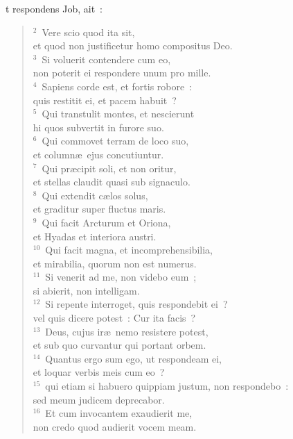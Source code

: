 \bchapter
{}t respondens Job, ait~:
\begin{flushleft}\begin{verse}\vspace{6pt}${}^{2}$~Vere scio quod ita sit,\\ et quod non justificetur homo compositus Deo.\\
${}^{3}$~Si voluerit contendere cum eo,\\ non poterit ei respondere unum pro mille.\\
${}^{4}$~Sapiens corde est, et fortis robore~:\\ quis restitit ei, et pacem habuit~?\\
${}^{5}$~Qui transtulit montes, et nescierunt\\ hi quos subvertit in furore suo.\\
${}^{6}$~Qui commovet terram de loco suo,\\ et column\ae\ ejus concutiuntur.\\
${}^{7}$~Qui pr\ae cipit soli, et non oritur,\\ et stellas claudit quasi sub signaculo.\\
${}^{8}$~Qui extendit c\ae los solus,\\ et graditur super fluctus maris.\\
${}^{9}$~Qui facit Arcturum et Oriona,\\ et Hyadas et interiora austri.\\
${}^{10}$~Qui facit magna, et incomprehensibilia,\\ et mirabilia, quorum non est numerus.\\
${}^{11}$~Si venerit ad me, non videbo eum~;\\ si abierit, non intelligam.\\
${}^{12}$~Si repente interroget, quis respondebit ei~?\\ vel quis dicere potest~: Cur ita facis~?\\
${}^{13}$~Deus, cujus ir\ae\ nemo resistere potest,\\ et sub quo curvantur qui portant orbem.\\
${}^{14}$~Quantus ergo sum ego, ut respondeam ei,\\ et loquar verbis meis cum eo~?\\
${}^{15}$~qui etiam si habuero quippiam justum, non respondebo~:\\ sed meum judicem deprecabor.\\
${}^{16}$~Et cum invocantem exaudierit me,\\ non credo quod audierit vocem meam.\\

\end{verse}
\end{flushleft}
